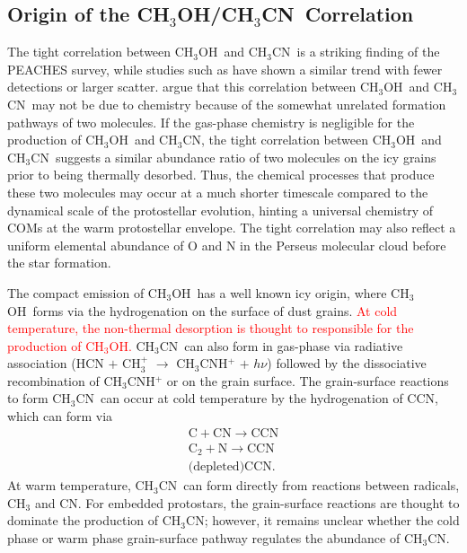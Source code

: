 \documentclass[twocolumn]{aastex62}
\newcommand{\methanol}{\mbox{CH$_{3}$OH}}
\newcommand{\methylcyanide}{\mbox{CH$_{3}$CN}}
\begin{document}
\subsection{Origin of the \methanol/\methylcyanide\ Correlation}
The tight correlation between \methanol\ and \methylcyanide\ is a striking finding of the PEACHES survey, while studies such as \citet{2017ApJ...841..120B,2020A&A...635A.198B} have shown a similar trend with fewer detections or larger scatter.  \citet{2020A&A...635A.198B} argue that this correlation between \methanol\ and \methylcyanide\ may not be due to chemistry because of the somewhat unrelated formation pathways of two molecules.  If the gas-phase chemistry is negligible for the production of \methanol\ and \methylcyanide, the tight correlation between \methanol\ and \methylcyanide\ suggests a similar abundance ratio of two molecules on the icy grains prior to being thermally desorbed.  Thus, the chemical processes that produce these two molecules may occur at a much shorter timescale compared to the dynamical scale of the protostellar evolution, hinting a universal chemistry of COMs at the warm protostellar envelope.  The tight correlation may also reflect a uniform elemental abundance of O and N in the Perseus molecular cloud before the star formation.

The compact emission of \methanol\ has a well known icy origin, where \methanol\ forms via the hydrogenation on the surface of dust grains.  \textcolor{red}{At cold temperature, the non-thermal desorption is thought to responsible for the production of \methanol.}  \methylcyanide\ can also form in gas-phase via radiative association (HCN $+$ CH$_3^+$ $\rightarrow$ CH$_3$CNH$^+$ $+$ $h\nu$) followed by the dissociative recombination of CH$_3$CNH$^+$ or on the grain surface.  The grain-surface reactions to form \methylcyanide\ can occur at cold temperature by the hydrogenation of CCN, which can form via
\begin{align}
  \text{C} + \text{CN} \rightarrow \text{CCN} \nonumber \\
  \text{C}_2 + \text{N} \rightarrow \text{CCN} \nonumber \\
  \text{(depleted)} \text{CCN}.
\end{align}
At warm temperature, \methylcyanide\ can form directly from reactions between radicals, CH$_3$ and CN.  For embedded protostars, the grain-surface reactions are thought to dominate the production of \methylcyanide; however, it remains unclear whether the cold phase or warm phase grain-surface pathway regulates the abundance of \methylcyanide.  
\end{document}
